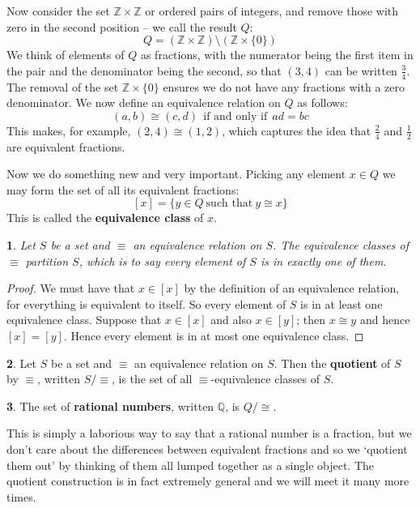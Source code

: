 \documentclass[oneside,english]{amsbook}
\numberwithin{section}{chapter}
\theoremstyle{plain}
\newtheorem{thm}{\protect\theoremname}
\theoremstyle{definition}
\newtheorem{defn}[thm]{\protect\definitionname}
\providecommand{\definitionname}{Definition}
\providecommand{\theoremname}{Theorem}
\begin{document}
Now consider the set $\mathbb{Z}\times\mathbb{Z}$ or ordered pairs of integers, and remove those with zero in the second position -- we call the result $Q$:
\[
	Q = (\mathbb{Z}\times\mathbb{Z})\setminus (\mathbb{Z}\times\{0\})
\]
We think of elements of $Q$ as fractions, with the numerator being the first item in the pair and the denominator being the second, so that $(3,4)$ can be written $\frac{3}{4}$. The removal of the set $\mathbb{Z}\times\{0\}$ ensures we do not have any fractions with a zero denominator. We now define an equivalence relation on $Q$ as follows:
\[
	(a,b)\cong (c,d)\ \ \text{if and only if} \ \ ad = bc
\]
This makes, for example, $(2,4)\cong (1,2)$, which captures the idea that $\frac{2}{4}$ and $\frac{1}{2}$ are equivalent fractions.

Now we do something new and very important. Picking any element $x\in Q$ we may form the set of all its equivalent fractions:
\[
	[x] = \{y\in Q \ \text{such that}\ y\cong x\}
\]
This is called the \textbf{equivalence class} of $x$. 

\begin{thm}
	Let $S$ be a set and $\equiv$ an equivalence relation on $S$. The equivalence classes of $\equiv$ partition $S$, which is to say every element of $S$ is in exactly one of them.
\end{thm}

\begin{proof}
	We must have that $x\in [x]$ by the definition of an equivalence relation, for everything is equivalent to itself. So every element of $S$ is in at least one equivalence class. Suppose that $x\in [x]$ and also $x\in [y]$; then $x\cong y$ and hence $[x]=[y]$.  Hence every element is in at most one equivalence class. 
\end{proof}

\begin{defn}
	Let $S$ be a set and $\equiv$ an equivalence relation on $S$. Then the \textbf{quotient} of $S$ by $\equiv$, written $S/\equiv$, is the set of all $\equiv$-equivalence classes of $S$.
\end{defn}

\begin{defn}
	The set of \textbf{rational numbers}, written $\mathbb{Q}$,  is $Q/\cong$.
\end{defn}

This is simply a laborious way to say that a rational number is a fraction, but we don't care about the differences between equivalent fractions and so we `quotient them out' by thinking of them all lumped together as a single object. The quotient construction is in fact extremely general and we will meet it many more times.
\end{document}
